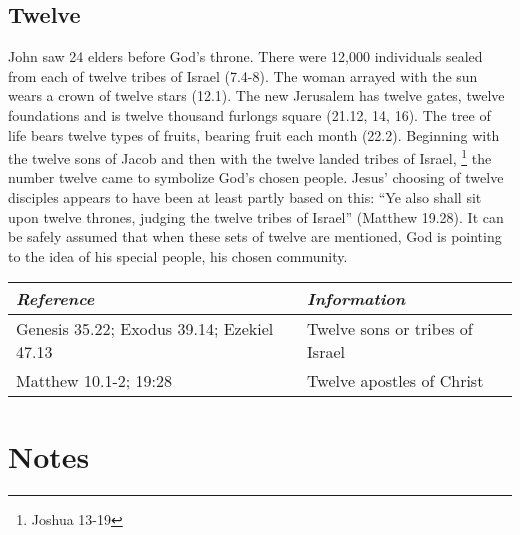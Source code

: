 \section*{Twelve}
John saw 24 elders before God's throne. There were 12,000 individuals sealed from each of twelve tribes of Israel (7.4-8). The woman arrayed with the sun wears a crown of twelve stars (12.1). The new Jerusalem has twelve gates, twelve foundations and is twelve thousand furlongs square (21.12, 14, 16). The tree of life bears twelve types of fruits, bearing fruit each month (22.2). 
\newline\newline
Beginning with the twelve sons of Jacob and then with the twelve landed tribes of Israel,%
\footnote{Joshua 13-19} %
the number twelve came to symbolize God's chosen people. Jesus' choosing of twelve disciples appears to have been at least partly based on this: ``Ye also shall sit upon twelve thrones, judging the twelve tribes of Israel'' (Matthew 19.28). 
\newline\newline
It can be safely assumed that when these sets of twelve are mentioned, God is pointing to the idea of his special people, his chosen community.
\newline\newline
\begin{tabularx}{\textwidth}{l X}
\toprule
\rowcolor{headergray}\emph{Reference} & \emph{Information}\\ 
\midrule
Genesis 35.22; Exodus 39.14; Ezekiel 47.13 & Twelve sons or tribes of Israel \\
\addlinespace
Matthew 10.1-2; 19:28 & Twelve apostles of Christ \\
\bottomrule
\end{tabularx}

\printindex[gen]
\chapter{Notes}
\fancyhead{} %
\newpage\mbox{}\cleardoublepage
\newpage\mbox{}\cleardoublepage
\renewcommand*{\BRbooktitlestyle}[1]{\textbf{#1}\nopagebreak}
\clearpage
{}
\fancyhead{} %
\printindex[scr]